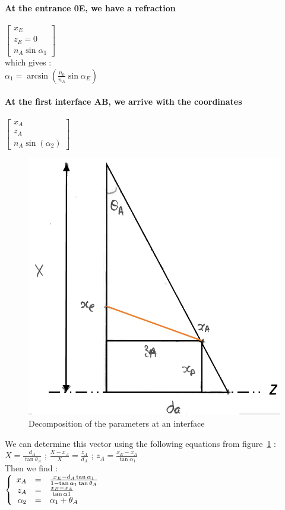\paragraph*{At the entrance 0E, we have a refraction}
$\begin{bmatrix}x_E \\ z_E = 0 \\ n_A\sin\alpha_1\end{bmatrix}$\\

which gives :\\

$\alpha_1 = \arcsin\left(\frac{n_0}{n_A}\sin\alpha_E\right) $

\paragraph*{At the first interface AB, we arrive with the coordinates}

$\begin{bmatrix}x_A \\ z_A \\ n_A\sin\left(\alpha_2\right)\end{bmatrix}$
\begin{figure}[H]
\centering
	\includegraphics[width = .3\textwidth]{images/triangleGeo.png}
	\caption{Decomposition of the parameters at an interface}\label{fig:triangle}
	\centering
\end{figure}
We can determine this vector using the following equations from figure~\ref{fig:triangle} :\\

$X = \frac{d_A}{\tan\theta_A}$ ; $\frac{X-x_A}{X} = \frac{z_A}{d_A}$ ; $z_A = \frac{x_E-x_A}{\tan\alpha_1}$\\

Then we find :\\
$\left \{
   \begin{array}{r c l}
      x_A  & = & \frac{x_E-d_A\tan\alpha_1}{1-\tan\alpha_1\tan\theta_A} \\
      z_A   & = & \frac{x_E-x_A}{\tan\alpha1} \\
      \alpha_2 & = & \alpha_1+\theta_A
   \end{array}
\right.$

